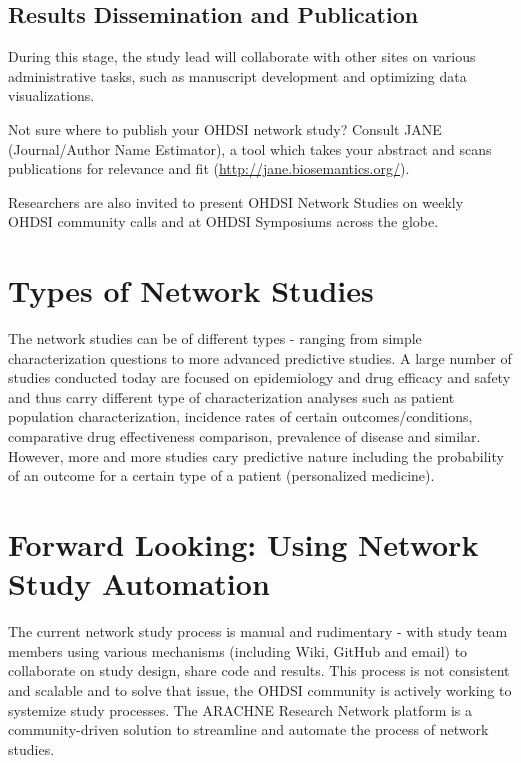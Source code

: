 \documentclass[11pt]{book}
\theoremstyle{definition}
\theoremstyle{definition}
\theoremstyle{definition}
\theoremstyle{remark}
\let\BeginKnitrBlock\begin \let\EndKnitrBlock\end
\begin{document}
\hypertarget{results-dissemination-and-publication}{%
\subsection{Results Dissemination and Publication}\label{results-dissemination-and-publication}}

During this stage, the study lead will collaborate with other sites on various administrative tasks, such as manuscript development and optimizing data visualizations.

\BeginKnitrBlock{rmdimportant}
Not sure where to publish your OHDSI network study? Consult JANE (Journal/Author Name Estimator), a tool which takes your abstract and scans publications for relevance and fit (\url{http://jane.biosemantics.org/}).
\EndKnitrBlock{rmdimportant}

Researchers are also invited to present OHDSI Network Studies on weekly OHDSI community calls and at OHDSI Symposiums across the globe.

\hypertarget{types-of-network-studies}{%
\section{Types of Network Studies}\label{types-of-network-studies}}

The network studies can be of different types - ranging from simple characterization questions to more advanced predictive studies. A large number of studies conducted today are focused on epidemiology and drug efficacy and safety and thus carry different type of characterization analyses such as patient population characterization, incidence rates of certain outcomes/conditions, comparative drug effectiveness comparison, prevalence of disease and similar. However, more and more studies cary predictive nature including the probability of an outcome for a certain type of a patient (personalized medicine).

\hypertarget{forward-looking-using-network-study-automation}{%
\section{Forward Looking: Using Network Study Automation}\label{forward-looking-using-network-study-automation}}

The current network study process is manual and rudimentary - with study team members using various mechanisms (including Wiki, GitHub and email) to collaborate on study design, share code and results. This process is not consistent and scalable and to solve that issue, the OHDSI community is actively working to systemize study processes. The ARACHNE Research Network platform is a community-driven solution to streamline and automate the process of network studies.
\end{document}
